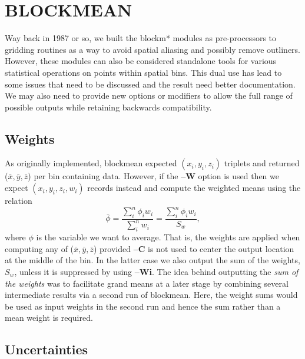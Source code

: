 \documentclass[12pt,letterpaper,margin=0.5in]{report}
\begin{document}
\section*{BLOCKMEAN}

Way back in 1987 or so, we built the blockm* modules as pre-processors to gridding routines as a way to avoid spatial aliasing
and possibly remove outliners.  However, these modules can also be considered standalone tools for various
statistical operations on points within spatial bins.  This dual use has lead to some issues that need to
be discussed and the result need better documentation.  We may also need to provide new options or modifiers
to allow the full range of possible outputs while retaining backwards compatibility.

\subsection*{Weights}
As originally implemented, blockmean expected $(x_i,y_i,z_i)$ triplets and returned ($\bar{x}, \bar{y}, \bar{z}$)
per bin containing data.
However, if the {\bf --W} option is used then we expect $(x_i,y_i,z_i,w_i)$ records instead and compute the weighted means
using the relation
\begin{equation}
	\bar{\phi} = \frac{\sum_i^n \phi_i w_i}{\sum_i^n w_i} = \frac{\sum_i^n \phi_i w_i}{S_w},
	\label{eq:weighted}
\end{equation}
where $\phi$ is the variable we want to average.  That is, the weights are applied when computing any of  ($\bar{x}, \bar{y}, \bar{z}$)
provided {\bf --C} is not used to center the output location at the middle of the bin.
In the latter case we also output the sum of the weights, $S_w$, unless it is suppressed by using {\bf--Wi}.  The idea
behind outputting the \emph{sum of the weights} was to facilitate grand means at a later stage by combining several
intermediate results via a second run of blockmean.  Here, the weight sums would be used as input weights in the second
run and hence the sum rather than a mean weight is required.

\subsection*{Uncertainties}
\end{document}
